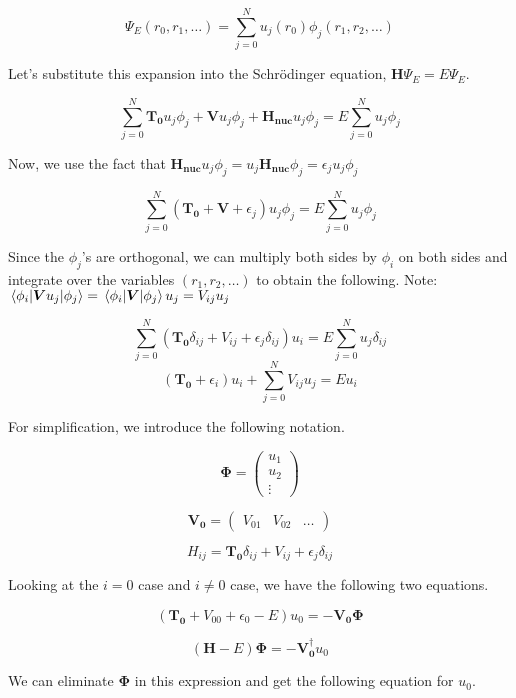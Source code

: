\documentclass[12pt,letterpaper]{article}
\numberwithin{equation}{section}
\newcommand{\beq}{\begin{equation}}
\newcommand{\eeq}{\end{equation}}
\begin{document}
\beq
\Psi_E(r_0,r_1,\dots) = \sum_{j=0}^{N} u_j(r_0)\phi_j(r_1,r_2,\dots)
\eeq

\noindent Let's substitute this expansion into the Schrödinger equation, $\boldsymbol{H} \Psi_E = E \Psi_E$. 

\beq
\sum_{j=0}^{N} \boldsymbol{T_0}u_j\phi_j + \boldsymbol{V}u_j\phi_j + \boldsymbol{H_{nuc}}u_j\phi_j = E \sum_{j=0}^{N} u_j\phi_j
\eeq

\noindent Now, we use the fact that $\boldsymbol{H_{nuc}}u_j\phi_j = u_j\boldsymbol{H_{nuc}}\phi_j = \epsilon_j u_j\phi_j$

\beq
\sum_{j=0}^{N} (\boldsymbol{T_0} + \boldsymbol{V} + \epsilon_j) u_j\phi_j = E \sum_{j=0}^{N} u_j\phi_j
\eeq

\noindent Since the $\phi_j$'s are orthogonal, we can multiply both sides by $\phi_i$ on both sides and integrate over the variables $(r_1,r_2,\dots)$ to obtain the following.
\newline
Note: $\matrixel{\phi_i}{\boldsymbol{V}u_j}{\phi_j} = \matrixel{\phi_i}{\boldsymbol{V}}{\phi_j}u_j = V_{ij}u_j$ 

\beq
\sum_{j=0}^{N}(\boldsymbol{T_0}\delta_{ij} + V_{ij} + \epsilon_j\delta_{ij}) u_i = E \sum_{j=0}^{N}u_j\delta_{ij}
\eeq
\beq
(\boldsymbol{T_0} + \epsilon_i) u_i +  \sum_{j=0}^{N}V_{ij}u_j = E u_i
\eeq

\noindent For simplification, we introduce the following notation.

\beq
\boldsymbol{\Phi} =
\begin{pmatrix}
u_1 \\ u_2 \\ \vdots
\end{pmatrix}
\eeq

\beq
\boldsymbol{V_0} =
\begin{pmatrix}
V_{01} & V_{02} & \dots
\end{pmatrix}
\eeq

\beq
H_{ij} = \boldsymbol{T_0}\delta_{ij} + V_{ij} + \epsilon_j\delta_{ij}
\eeq

\noindent Looking at the  $i = 0$ case and $i \neq 0$ case, we have the following two equations.

\beq
(\boldsymbol{T_0} + V_{00} + \epsilon_0 - E)u_0 = -\boldsymbol{V_0}\boldsymbol{\Phi}
\eeq

\beq
(\boldsymbol{H} - E)\boldsymbol{\Phi} = -\boldsymbol{V_0^\dagger}u_0
\eeq

\noindent We can eliminate $\boldsymbol{\Phi}$ in this expression and get the following equation for $u_0$.
\end{document}
